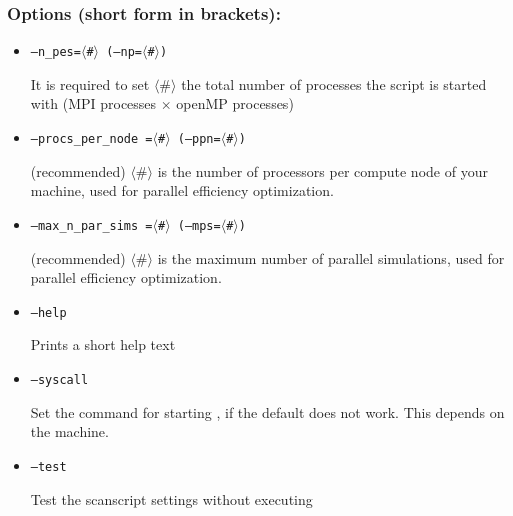 \documentclass[12pt]{article}
\begin{document}
\subsubsection{Options (short form in brackets):}\label{sec:scanoptions}
\begin{itemize}

\item \texttt{--n\_pes=$\langle$\#$\rangle$ (--np=$\langle$\#$\rangle$)}

It is required to set $\langle$\#$\rangle$ the total number of processes
the script is started with (MPI processes $\times$ openMP processes)

\item \texttt{--procs\_per\_node =$\langle$\#$\rangle$ (--ppn=$\langle$\#$\rangle$)}

(recommended) $\langle$\#$\rangle$ is the number of processors per
compute node of your machine, used for parallel efficiency optimization.

\item \texttt{--max\_n\_par\_sims =$\langle$\#$\rangle$ (--mps=$\langle$\#$\rangle$)}

(recommended) $\langle$\#$\rangle$ is the maximum number of parallel
simulations, used for parallel efficiency optimization.

\item \texttt{--help}

Prints a short help text 

%
%
%

\item \texttt{--syscall}

Set the command for starting \gene, if the default does not work. This depends on the machine.

\item \texttt{--test }

Test the scanscript settings without executing \gene


\end{itemize}
\end{document}
